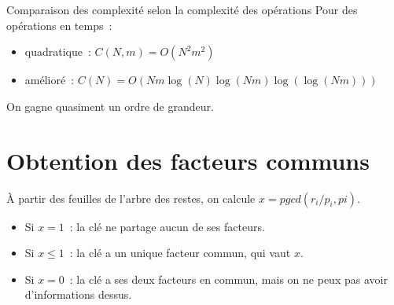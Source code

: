 \documentclass{beamer}
\begin{document}
\begin{frame}
 \begin{block}{Comparaison des complexité selon la complexité des opérations}
  Pour des opérations en temps~:
  \begin{itemize}
   \item quadratique~: $C(N,m) = O(N^2m^2)$
   \item amélioré~: $C(N) = O(Nm\log(N)\log(Nm)\log(\log(Nm)))$
  \end{itemize}
 \end{block}
 
 On gagne quasiment un ordre de grandeur.

\section{Obtention des facteurs communs}
\end{frame}
  
\begin{frame}
   À partir des feuilles de l'arbre des restes, on calcule $x = pgcd(r_i/p_i,pi)$.
   \begin{block}
   \begin{itemize}
    \item Si $x=1$~: la clé ne partage aucun de ses facteurs.
    \item Si $x \leq 1$~: la clé a un unique facteur commun, qui vaut $x$.
    \item Si $x=0$~: la clé a ses deux facteurs en commun, mais on ne peux pas avoir d'informations dessus.
   \end{itemize}
   \end{block}

   
\end{frame}
\end{document}

